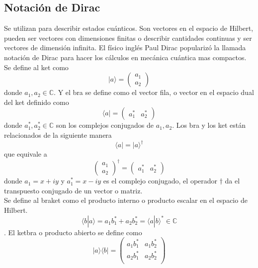 \documentclass[a4paper]{article}
\begin{document}
\subsection{Notación de Dirac}
Se utilizan para describir estados cuánticos. Son vectores en el espacio de Hilbert, pueden ser vectores con dimensiones finitas o describir cantidades continuas y ser vectores de dimensión infinita. El físico inglés Paul Dirac popularizó la llamada notación de Dirac para hacer los cálculos en mecánica cuántica mas compactos.
Se define al ket como
\begin{equation}
|a\rangle=
	\begin{pmatrix}
		a_1\\
		a_2
	\end{pmatrix}
\end{equation}
donde $a_1, a_2 \in \mathbb{C} $. Y el bra se define como el vector fila, o vector en el espacio dual del ket definido como 
\begin{equation}
\langle a|=
	\begin{pmatrix}
		a_1^*&a_2^*
	\end{pmatrix}
\end{equation}
donde $a_1^*, a_2^* \in \mathbb{C} $ son los complejos conjugados de $a_1, a_2$.
Los bra y los ket están relacionados de la siguiente manera
\begin{equation}
\langle a|=|a\rangle^\dagger
\end{equation}
que equivale a 
\begin{equation}
\begin{pmatrix}
		a_1\\
		a_2
	\end{pmatrix}^\dagger=
	\begin{pmatrix}
		a_1^*&a_2^*
	\end{pmatrix}
\end{equation}
donde $a_1=x+iy$ y $a_1^*=x-iy$ es el complejo conjugado, el operador $\dagger$ da el transpuesto conjugado de un vector o matriz.\\
Se define al braket como el producto interno o producto escalar en el espacio de Hilbert.
\begin{equation}
\langle b | a\rangle=a_1b_1^*+a_2b_2^*=\langle a | b\rangle^*\in \mathbb{C}
\end{equation}.
El ketbra o producto abierto se define como 
\begin{equation}
|a\rangle\langle b|=
	\begin{pmatrix}
		a_1 b_1^*& a_1 b_2^*\\
		a_2 b_1^*& a_2 b_2^*\\
	\end{pmatrix}
\end{equation}
\end{document}
